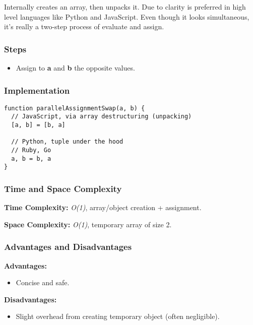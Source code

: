 Internally creates an array, then unpacks it. Due to clarity is preferred in high level languages like Python and JavaScript. Even though it looks simultaneous, it's really a two-step process of evaluate and assign.

\subsubsection*{Steps}

\begin{itemize}
  \item Assign to \textbf{a} and \textbf{b} the opposite values.
\end{itemize}

\subsubsection*{Implementation}

\begin{lstlisting}[style=general]
function parallelAssignmentSwap(a, b) {
  // JavaScript, via array destructuring (unpacking)
  [a, b] = [b, a]

  // Python, tuple under the hood
  // Ruby, Go
  a, b = b, a
}
\end{lstlisting}

\subsubsection*{Time and Space Complexity}

\textbf{Time Complexity:} \textit{O(1)}, array/object creation + assignment.

\textbf{Space Complexity:} \textit{O(1)}, temporary array of size 2.

\subsubsection*{Advantages and Disadvantages}

\textbf{Advantages:}

\begin{itemize}
  \item Concise and safe.
\end{itemize}

\textbf{Disadvantages:}

\begin{itemize}
  \item Slight overhead from creating temporary object (often negligible).
\end{itemize}
